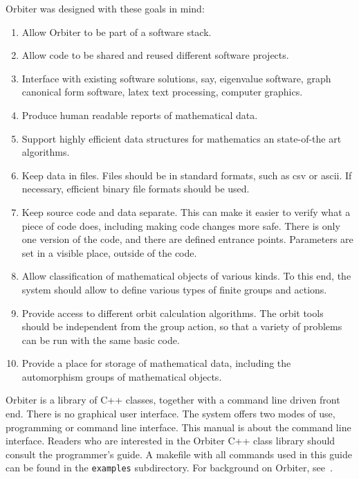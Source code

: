 Orbiter was designed with these goals in mind:
\begin{enumerate}
\item
Allow Orbiter to be part of a software stack. 
\item
Allow code to be shared and reused different software projects.
\item
Interface with existing software solutions, say, eigenvalue software, 
graph canonical form software, latex text processing, computer graphics.
\item
Produce human readable reports of mathematical data. 
\item
Support highly efficient data structures for mathematics an state-of-the art algorithms. 
\item
Keep data in files. Files should be in standard formats, such as csv or ascii. 
If necessary, efficient binary file formats should be used.
\item
Keep source code and data separate. 
This can make it easier to verify what a piece of code does, 
including making code changes more safe. 
There is only one version of the code, and there are defined entrance points. 
Parameters are set in a visible place, outside of the code.
\item
Allow classification of mathematical objects of various kinds. 
To this end, the system should allow to define various types of finite groups and actions. 
\item
Provide access to different orbit calculation algorithms.
The orbit tools should be independent from the group action, 
so that a variety of problems can be run with the same basic code.
\item
Provide a place for storage of mathematical data, 
including the automorphism groups of mathematical objects.
\end{enumerate}


\bigskip



Orbiter is a library of C++ classes, together with a command line driven front end.
There is no graphical user interface.
The system offers two modes of use, programming or command line interface.
This manual is about the command line interface.
Readers who are interested in the Orbiter C++ class library should consult the programmer's guide.
A makefile with all commands used in this guide can be found in the \verb'examples' subdirectory.
For background on Orbiter, see~\cite{Betten2020}.






